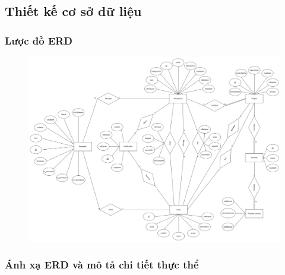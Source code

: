 \subsection{Thiết kế cơ sở dữ liệu}
\subsubsection{Lược đồ ERD}
\begin{figure}[H]
        \centering
        \includegraphics[width=\linewidth]{Content/Phân tích và thiết kế hệ thống/images/erd.png}
        \label{fig:enter-label}
\end{figure}
\subsubsection{Ánh xạ ERD và mô tả chi tiết thực thể}
